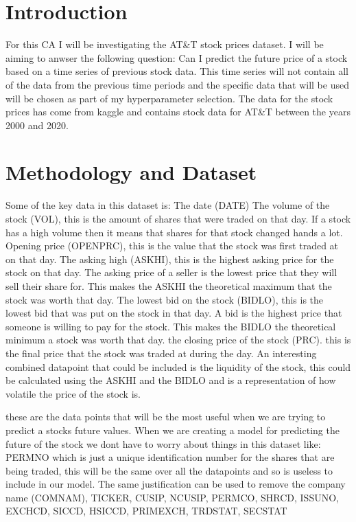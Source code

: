 \documentclass{report}
\begin{document}
\section{Introduction}
For this CA I will be investigating the AT&T stock prices dataset.
I will be aiming to anwser the following question: Can I predict the future price of a stock based on a time series of previous stock data.
This time series will not contain all of the data from the previous time periods and the specific data that will be used will be chosen as part of my hyperparameter selection.
The data for the stock prices has come from kaggle and contains stock data for AT&T between the years 2000 and 2020.

\section{Methodology and Dataset}
Some of the key data in this dataset is: The date (DATE)
The volume of the stock (VOL), this is the amount of shares that were traded on that day. If a stock has a high volume then it means that shares for that stock changed hands a lot.
Opening price (OPENPRC), this is the value that the stock was first traded at on that day.
The asking high (ASKHI), this is the highest asking price for the stock on that day. The asking price of a seller is the lowest price that they will sell their share for. This makes the ASKHI the theoretical maximum that the stock was worth that day.
The lowest bid on the stock (BIDLO), this is the lowest bid that was put on the stock in that day. A bid is the highest price that someone is willing to pay for the stock. This makes the BIDLO the theoretical minimum a stock was worth that day.
the closing price of the stock (PRC). this is the final price that the stock was traded at during the day.
An interesting combined datapoint that could be included is the liquidity of the stock, this could be calculated using the ASKHI and the BIDLO and is a representation of how volatile the price of the stock is.

these are the data points that will be the most useful when we are trying to predict a stocks future values.
When we are creating a model for predicting the future of the stock we dont have to worry about things in this dataset like:
PERMNO which is just a unique identification number for the shares that are being traded, this will be the same over all the datapoints and so is useless to include in our model.
The same justification can be used to remove the company name (COMNAM), TICKER, CUSIP, NCUSIP, PERMCO, SHRCD, ISSUNO, EXCHCD, SICCD, HSICCD, PRIMEXCH, TRDSTAT, SECSTAT
\end{document}
